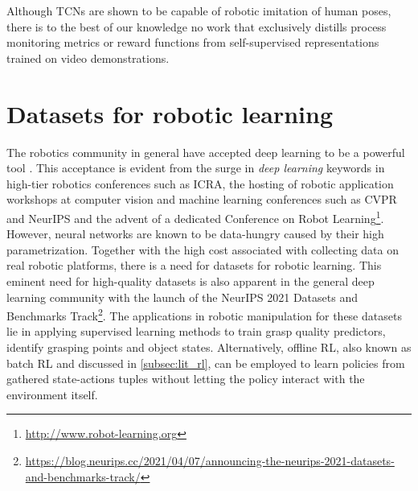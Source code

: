 \documentclass[\home/main.tex]{subfiles}
\begin{document}
Although \glspl{TCN} are shown to be capable of robotic imitation of human poses, there is to the best of our knowledge no work that exclusively distills process monitoring metrics or reward functions from self-supervised representations trained on video demonstrations. %

\section{Datasets for robotic learning} \label{sec:lit_datasets}
The robotics community in general have accepted deep learning to be a powerful tool \autocite{Sunderhauf2018}. This acceptance is evident from the surge in \textit{deep learning} keywords in high-tier robotics conferences such as ICRA, the hosting of robotic application workshops at computer vision and machine learning conferences such as CVPR \autocite{angelova2017computer} and NeurIPS \autocite{Posner2017} and the advent of a dedicated Conference on Robot Learning\footnote{\url{http://www.robot-learning.org}}. However, neural networks are known to be data-hungry caused by their high parametrization. Together with the high cost associated with collecting data on real robotic platforms, there is a need for datasets for robotic learning. This eminent need for high-quality datasets is also apparent in the general deep learning community with the launch of the NeurIPS 2021 Datasets and Benchmarks Track\footnote{\url{https://blog.neurips.cc/2021/04/07/announcing-the-neurips-2021-datasets-and-benchmarks-track/}}. The applications in robotic manipulation for these datasets lie in applying supervised learning methods to train grasp quality predictors, identify grasping points and object states. Alternatively, offline RL, also known as batch RL and discussed in \cref{subsec:lit_rl}, can be employed to learn policies from gathered state-actions tuples without letting the policy interact with the environment itself.
\end{document}

